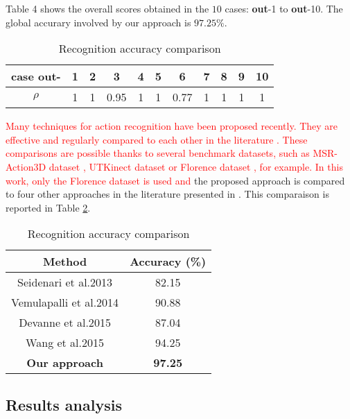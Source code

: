 \documentclass[letterpaper, 10 pt, conference]{ieeeconf}  %
\begin{document}
Table 4 shows the overall scores obtained in the $10$ cases: \textbf{out}-1 to \textbf{out}-10. The global accurary involved by our approach is $97.25\%$.

\begin{table}[h]
\caption{Recognition accuracy comparison}
\label{table4}
\begin{center}
\begin{tabular}{|c||c|c|c|c|c|c|c|c|c|c|}
\hline
case \textbf{out-} & 1 & 2 & 3 & 4 & 5 & 6 & 7 & 8 & 9 & 10\\
\hline
$\rho$ & 1 &   1 &  0.95 &    1 &     1 &    0.77 &     1 &   1 &   1 & 1\\
\hline
\end{tabular}
\end{center}
\end{table}

\textcolor{red}{Many techniques for action recognition have been proposed recently. They are effective and regularly compared to each other in the literature \cite{tra13,xia12}. These comparisons are possible thanks to several benchmark datasets, such as MSR-Action3D dataset \cite{liw10}, UTKinect dataset \cite{xia12} or Florence dataset \cite{sei13}, for example. In this work, only the Florence dataset is used and} the proposed approach is compared to four other approaches in the literature presented in \cite{wan16}. This comparaison is reported in Table \ref{table_example}.

\begin{table}[h]
\caption{Recognition accuracy comparison}
\label{table_example}
\begin{center}
\begin{tabular}{|c||c|}
\hline
Method & Accuracy (\%)\\
\hline
\hline
Seidenari et al.2013\cite{sei13}  & 82.15\\
\hline
\hline
Vemulapalli et al.2014 \cite{vem14} & 90.88\\
\hline
Devanne et al.2015 \cite{dev15} & 87.04\\
\hline
Wang et al.2015 \cite{wan16} & 94.25\\
\hline
\textbf{Our approach}  & \textbf{97.25}\\
\hline
\end{tabular}
\end{center}
\end{table}


\subsection{Results analysis}
\end{document}
